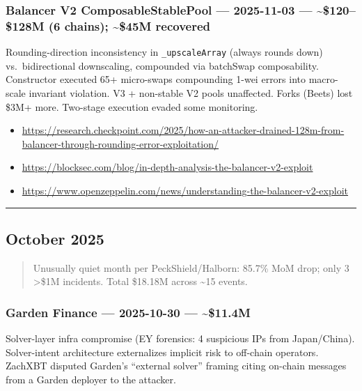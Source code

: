 \subsubsection{Balancer V2 ComposableStablePool --- 2025-11-03 --- \textasciitilde\$120--\$128M (6 chains); \textasciitilde\$45M recovered}\label{balancer-v2-composablestablepool-2025-11-03-120128m-6-chains-45m-recovered}

Rounding-direction inconsistency in \texttt{\_upscaleArray} (always rounds down) vs.~bidirectional downscaling, compounded via batchSwap composability. Constructor executed 65+ micro-swaps compounding 1-wei errors into macro-scale invariant violation. V3 + non-stable V2 pools unaffected. Forks (Beets) lost \$3M+ more. Two-stage execution evaded some monitoring.

\begin{itemize}
\tightlist
\item
  \url{https://research.checkpoint.com/2025/how-an-attacker-drained-128m-from-balancer-through-rounding-error-exploitation/}
\item
  \url{https://blocksec.com/blog/in-depth-analysis-the-balancer-v2-exploit}
\item
  \url{https://www.openzeppelin.com/news/understanding-the-balancer-v2-exploit}
\end{itemize}

\begin{center}\rule{0.5\linewidth}{0.5pt}\end{center}

\subsection{October 2025}\label{october-2025}

\begin{quote}
Unusually quiet month per PeckShield/Halborn: 85.7\% MoM drop; only 3 \textgreater\$1M incidents. Total \$18.18M across \textasciitilde15 events.
\end{quote}

\subsubsection{Garden Finance --- 2025-10-30 --- \textasciitilde\$11.4M}\label{garden-finance-2025-10-30-11.4m}

Solver-layer infra compromise (EY forensics: 4 suspicious IPs from Japan/China). Solver-intent architecture externalizes implicit risk to off-chain operators. ZachXBT disputed Garden's ``external solver'' framing citing on-chain messages from a Garden deployer to the attacker.


